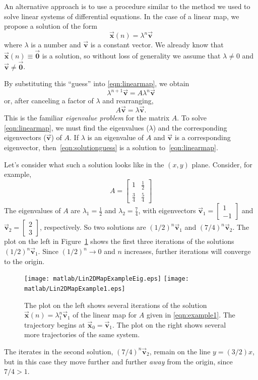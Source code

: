 \documentclass[reqno]{immbook}
\newcommand{\BV}{\vec{\textbf{v}}}
\newcommand{\BX}{\vec{\textbf{x}}}
\newcommand{\BZero}{\vec{\textbf{0}}}  %
\numberwithin{equation}{chapter}
\numberwithin{question}{section}
\numberwithin{theorem}{chapter}
\numberwithin{figure}{chapter}
\theoremstyle{definition}
\begin{document}
An alternative approach is to use a procedure similar to the
method we used to solve linear systems of differential equations.
In the case of a linear map, we propose a solution of the
form
\begin{equation}
   \BX(n) = \lambda^n \BV
\label{eqn:solutionguess}
\end{equation}
where $\lambda$ is a number and $\BV$ is a constant vector.
We already know that $\BX(n)\equiv\BZero$ is a solution, so without
loss of generality we assume that $\lambda\ne 0$ and
$\BV \ne \BZero$.

By substituting this ``guess'' into \eqref{eqn:linearmap},
we obtain
\begin{equation}
  \lambda^{n+1} \BV  = A\lambda^n\BV
\end{equation}
or, after canceling a factor of $\lambda$ and rearranging,
\begin{equation}
   A\BV = \lambda \BV.
\label{eqn:mapeigenvalueprob}
\end{equation}
This is the familiar \emph{eigenvalue problem}
for the matrix $A$.
To solve \eqref{eqn:linearmap}, we must find
the eigenvalues ($\lambda$) and
the corresponding eigenvectors ($\BV$) of $A$.
If $\lambda$ is an eigenvalue of $A$ and $\BV$ is a corresponding
eigenvector, then~\eqref{eqn:solutionguess} is a solution
to~\eqref{eqn:linearmap}.

Let's consider what such a solution looks like in the
$(x,y)$ plane.  Consider, for example,
\begin{equation}
   A = \begin{bmatrix} 1 & \frac{1}{2} \\
                      \frac{3}{4} & \frac{5}{4}
       \end{bmatrix}
\label{eqn:example1}
\end{equation}
The eigenvalues of $A$ are $\lambda_1 = \frac{1}{2}$
and $\lambda_2 = \frac{7}{4}$,
with eigenvectors $\BV_1 = \begin{bmatrix} 1 \\ -1 \end{bmatrix}$
and $\BV_2 = \begin{bmatrix} 2 \\ 3 \end{bmatrix}$, respectively.
So two solutions are $(1/2)^n\BV_1$ and $(7/4)^n\BV_2$.
The plot on the left in
Figure~\ref{fig:Lin2DMapExample1} shows the first three iterations
of the solutions $(1/2)^n\BV_1$.  Since
$(1/2)^n\rightarrow 0$ and $n$ increases, further iterations
will converge to the origin.
\begin{figure}
\centerline{%
\texttt{[image: matlab/Lin2DMapExampleEig.eps]}
\texttt{[image: matlab/Lin2DMapExample1.eps]}
}
\caption{%
The plot on the left shows several iterations of the
solution $\BX(n) = \lambda_1^n\BV_1$ of the linear map
for $A$ given in \eqref{eqn:example1}.
The trajectory begins at
$\BX_0 = \BV_1$.
The plot on the right shows several more trajectories
of the same system.
}
\label{fig:Lin2DMapExample1}
\end{figure}
The iterates in the second solution, $(7/4)^n\BV_2$,
remain on the line $y=(3/2)x$, but in this case they move further
and further \emph{away} from the origin, since $7/4 > 1$.
\end{document}
